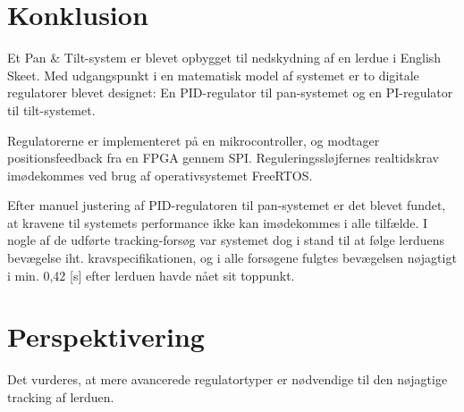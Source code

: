 \section{Konklusion}
\label{sec:konklusion}
Et Pan \& Tilt-system er blevet opbygget til nedskydning af en lerdue i English Skeet.
Med udgangspunkt i en matematisk model af systemet er to digitale regulatorer
blevet designet: En PID-regulator til pan-systemet og en PI-regulator til tilt-systemet.

Regulatorerne er implementeret på en mikrocontroller, og modtager positionsfeedback
fra en FPGA gennem SPI.
Reguleringssløjfernes realtidskrav imødekommes ved brug af operativsystemet FreeRTOS.

Efter manuel justering af PID-regulatoren til pan-systemet er det blevet fundet,
at kravene til systemets performance ikke kan imødekommes i alle tilfælde.
I nogle af de udførte tracking-forsøg var systemet dog i stand til at følge lerduens bevægelse
iht. kravspecifikationen,
og i alle forsøgene fulgtes bevægelsen nøjagtigt i min. 0,42 [s] efter lerduen havde nået sit toppunkt.

\section{Perspektivering}
Det vurderes, at mere avancerede regulatortyper er nødvendige til den nøjagtige tracking af lerduen.
